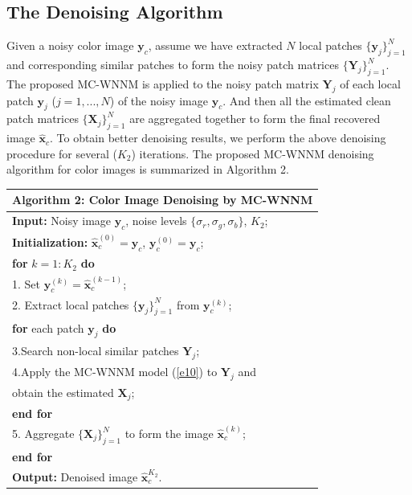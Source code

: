 \documentclass[10pt,twocolumn,letterpaper,sort&compress]{article}
\begin{document}
\subsection{The Denoising Algorithm}
Given a noisy color image $\mathbf{y}_{c}$, assume we have extracted $N$ local patches $\{\mathbf{y}_{j}\}_{j=1}^{N}$ and corresponding similar patches to form the noisy patch matrices $\{\mathbf{Y}_{j}\}_{j=1}^{N}$. The proposed MC-WNNM is applied to the noisy patch matrix $\mathbf{Y}_{j}$ of each local patch $\mathbf{y}_{j}$ ($j=1,...,N$) of the noisy image $\mathbf{y}_{c}$. And then all the estimated clean patch matrices $\{\mathbf{X}_{j}\}_{j=1}^{N}$ are aggregated together to form the final recovered image $\hat{\mathbf{x}}_{c}$. To obtain better denoising results, we perform the above denoising procedure for several ($K_{2}$) iterations. The proposed MC-WNNM denoising algorithm for color images is summarized in Algorithm 2.
\begin{table}
\begin{tabular}{l}
\hline
\textbf{Algorithm 2}: Color Image Denoising by MC-WNNM
\\
\hline
\textbf{Input:} Noisy image $\mathbf{y}_{c}$, noise levels $\{\sigma_{r}, \sigma_{g}, \sigma_{b}\}$, $K_{2}$;
\\
\textbf{Initialization:} $\hat{\mathbf{x}}_{c}^{(0)}=\mathbf{y}_{c}$, $\mathbf{y}_{c}^{(0)}=\mathbf{y}_{c}$;
\\
\textbf{for} $k = 1:K_{2}$ \textbf{do}
\\
1. Set $\mathbf{y}_{c}^{(k)}=\hat{\mathbf{x}}_{c}^{(k-1)}$;
\\
2. Extract local patches $\{\mathbf{y}_{j}\}_{j=1}^{N}$ from $\mathbf{y}_{c}^{(k)}$;
\\
\quad\textbf{for} each patch $\mathbf{y}_{j}$ \textbf{do}
\\
3.\quad Search non-local similar patches $\mathbf{Y}_{j}$;
\\
4.\quad Apply the MC-WNNM model (\ref{e10}) to $\mathbf{Y}_{j}$ and
\\
\quad \quad 
obtain the estimated $\mathbf{X}_{j}$;
\\
\quad\textbf{end for}
\\
5. Aggregate $\{\mathbf{X}_{j}\}_{j=1}^{N}$ to form the image $\hat{\mathbf{x}}_{c}^{(k)}$;
\\
\textbf{end for}
\\
\textbf{Output:} Denoised image $\hat{\mathbf{x}}_{c}^{K_{2}}$.
\\
\hline
\end{tabular}
\vspace{-1mm}
\label{a2}
\end{table}
\end{document}
